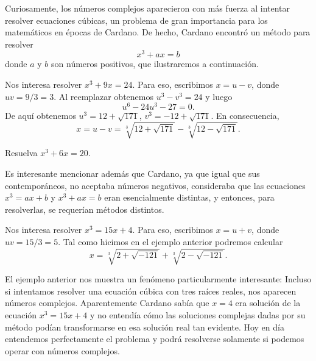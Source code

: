 Curiosamente, los números complejos aparecieron con más fuerza al intentar
resolver ecuaciones cúbicas, un problema de gran importancia para los
matemáticos en épocas de Cardano. De hecho, Cardano encontró un método para
resolver 
\[
	x^3+ax=b
\]
donde $a$ y $b$ son números positivos, que ilustraremos a continuación.

\begin{example}
	Nos interesa resolver $x^3+9x=24$. Para eso, escribimos $x=u-v$, donde
	$uv=9/3=3$. Al reemplazar obtenemos $u^3-v^3=24$ y luego 
	\[
		u^6-24u^3-27=0. 
	\]
	De aquí obtenemos $u^3=12+\sqrt{171}$, $v^3=-12+\sqrt{171}$. En
	consecuencia, 
	\[
		x=u-v=\sqrt[3]{12+\sqrt{171}}-\sqrt[3]{12-\sqrt{171}}.
	\]
\end{example}

\begin{exercise}
	Resuelva $x^3+6x=20$.
\end{exercise}


Es interesante mencionar además que Cardano, ya que igual que sus
contemporáneos, no aceptaba números negativos, consideraba que las ecuaciones
$x^3=ax+b$ y $x^3+ax=b$ eran esencialmente distintas, y entonces, para
resolverlas, se requerían métodos distintos.

\begin{example}
	Nos interesa resolver $x^3=15x+4$. Para eso, escribimos $x=u+v$, donde
	$uv=15/3=5$. Tal como hicimos en el ejemplo anterior podremos calcular
	\[
		x=\sqrt[3]{2+\sqrt{-121}}+\sqrt[3]{2-\sqrt{-121}}.
	\]

\end{example}

El ejemplo anterior nos muestra un fenómeno particularmente interesante:
Incluso si intentamos resolver una ecuación cúbica con tres raíces reales, nos
aparecen números complejos. Aparentemente Cardano sabía que $x=4$ era solución
de la ecuación $x^3=15x+4$ y no entendía cómo las soluciones complejas dadas
por su método podían transformarse en esa solución real tan evidente. Hoy en
día entendemos perfectamente el problema y podrá resolverse solamente si
podemos operar con números complejos. 



%

